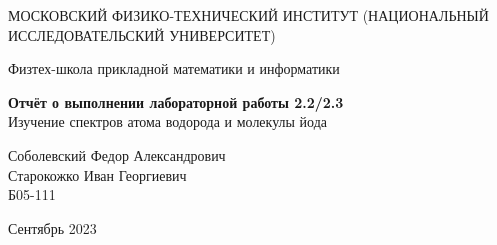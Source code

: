 \documentclass[a4paper,12pt]{article} %
\date{\today}
\begin{document}
\begin{titlepage}
	\begin{center}
		{\large МОСКОВСКИЙ ФИЗИКО-ТЕХНИЧЕСКИЙ ИНСТИТУТ (НАЦИОНАЛЬНЫЙ ИССЛЕДОВАТЕЛЬСКИЙ УНИВЕРСИТЕТ)}
	\end{center}
	\begin{center}
		{\large Физтех-школа прикладной математики и информатики}
	\end{center}
	
	
	\vspace{4.5cm}
	{\huge
		\begin{center}
			{\bf Отчёт о выполнении лабораторной работы 2.2/2.3}\\
			Изучение спектров атома водорода и молекулы йода
		\end{center}
	}
	\vspace{1cm}
	\begin{center}
		{\large Соболевский Федор Александрович \\
                    Старокожко Иван Георгиевич \\
			\vspace{0.2cm}
			Б05-111}
	\end{center}
	\vspace{8cm}
	\begin{center}
		  Сентябрь 2023
	\end{center}
\end{titlepage}






\newpage

\end{document}
